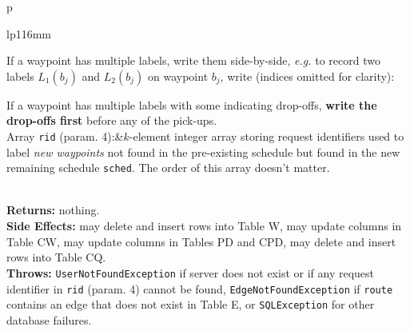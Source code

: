 \begin{tabular}{p{\textwidth}}
\begin{tabular}{lp{116mm}}

If a waypoint has multiple labels, write them side-by-side, \textit{e.g.}
to record two labels $L_1(b_j)$ and $L_2(b_j)$ on waypoint $b_j$, write
(indices omitted for clarity):


If a waypoint has multiple labels with some indicating drop-offs, \textbf{write
the drop-offs first} before any of the pick-ups.\\
Array {\tt{}rid} (param. 4):&$k$-element integer array storing request identifiers
used to label \emph{new waypoints} not found in the pre-existing schedule but
found in the new remaining schedule {\tt{}sched}. The order of this array doesn't
matter.
\end{tabular}\\
\textbf{Returns:} nothing.\\
\textbf{Side Effects:} may delete and insert rows into Table W, may
update columns in Table CW, may update columns in Tables PD and CPD,
may delete and insert rows into Table CQ.\\
\textbf{Throws:} {\tt{}UserNotFoundException} if server does not exist or if
any request identifier in {\tt{}rid} (param. 4) cannot be found,
{\tt{}EdgeNotFoundException} if {\tt{}route} contains an edge that does not exist
in Table E, or {\tt{}SQLException} for other database failures.\\
\bottomrule
\end{tabular}
\nwenddocs{}\endmoddef{}
